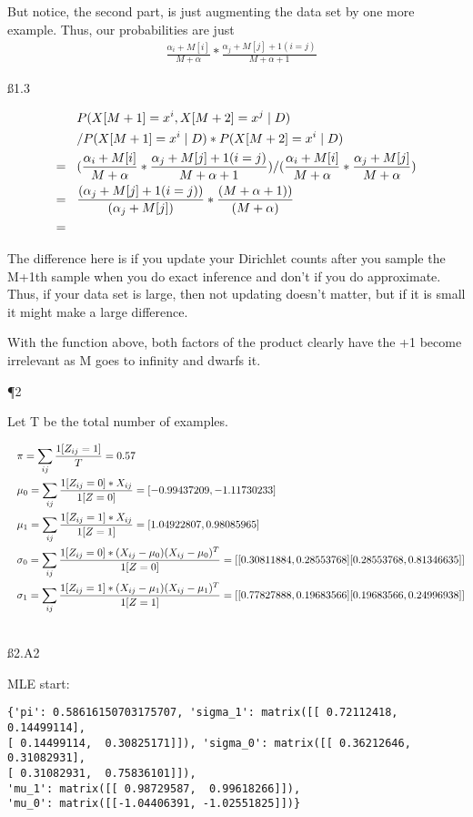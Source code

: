 But notice, the second part, is just augmenting the data set by one more example. Thus, our probabilities are just 
\begin{align*}
& \frac{\alpha_i + M[i]}{M + \alpha} * \frac{\alpha_j + M[j] + 1(i=j)}{M + \alpha + 1}
\end{align*}

\ss{1.3}

\begin{align*}
& P(X[M+1] = x^i, X[M+2] = x^j \mid D) \\ & / P(X[M+1] = x^i \mid D) * P(X[M+2] = x^i \mid  D) \\ = \hspace{3 mm} &
(\frac{\alpha_i + M[i]}{M + \alpha} * \frac{\alpha_j + M[j] + 1(i=j)}{M + \alpha + 1}) / (\frac{\alpha_i + M[i]}{M + \alpha} * \frac{\alpha_j + M[j]}{M + \alpha}) \\ = \hspace{3 mm} &
\frac{(\alpha_j + M[j] + 1(i=j))}{ (\alpha_j + M[j])} * \frac{(M + \alpha + 1))}{(M+\alpha)} \\ = \hspace{3 mm} &
\end{align*}

The difference here is if you update your Dirichlet counts after you sample the M+1th sample when you do exact inference and don't if you do approximate. Thus, if your data set is large, then not updating doesn't matter, but if it is small it might make a large difference.

With the function above, both factors of the product clearly have the +1 become irrelevant as M goes to infinity and dwarfs it.

\P 2

Let T be the total number of examples.

\begin{align*}
& \pi = \sum_{ij}\frac{1[Z_{ij}=1]}{T} = 0.57 \\ \hspace{3 mm} &
\mu_0 = \sum_{ij}\frac{1[Z_{ij}=0] * X_{ij}}{1[Z=0]} = [-0.99437209, -1.11730233] \\ \hspace{3 mm} &
\mu_1 = \sum_{ij}\frac{1[Z_{ij}=1] * X_{ij}}{1[Z=1]} = [ 1.04922807,  0.98085965] \\ \hspace{3 mm} &
\sigma_0 = \sum_{ij}\frac{1[Z_{ij}=0] * (X_{ij} - \mu_0) (X_{ij} - \mu_0) ^ T}{1[Z=0]} = [[ 0.30811884,  0.28553768]
 [ 0.28553768 , 0.81346635]] \\ \hspace{3 mm} &
\sigma_1 = \sum_{ij}\frac{1[Z_{ij}=1] * (X_{ij} - \mu_1) (X_{ij} - \mu_1) ^ T}{1[Z=1]} = [[ 0.77827888 , 0.19683566]
 [ 0.19683566,  0.24996938]] \\ \hspace{3 mm} &
\end{align*}

\ss{2.A2}


MLE start: 
\begin{verbatim}
{'pi': 0.58616150703175707, 'sigma_1': matrix([[ 0.72112418,  0.14499114],
[ 0.14499114,  0.30825171]]), 'sigma_0': matrix([[ 0.36212646,  0.31082931],
[ 0.31082931,  0.75836101]]),
'mu_1': matrix([[ 0.98729587,  0.99618266]]),
'mu_0': matrix([[-1.04406391, -1.02551825]])}
\end{verbatim}

